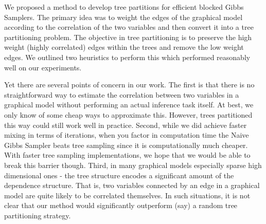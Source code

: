 \documentclass{article} %
\begin{document}
We proposed a method to develop tree partitions for efficient blocked Gibbs
Samplers. The primary idea was to weight the edges of the graphical model
according to the correlation of the two variables and then convert it into a
tree partitioning problem. The objective in tree partitioning is to preserve the
high weight (highly correlated) edges within the trees and remove the low
weight edges. We outlined two heuristics to perform this which performed
reasonably well on our experiments.

Yet there are several points of concern in our work. The first is that there
is no straightforward way to estimate the correlation between two variables in a
graphical model without performing an actual inference task itself. At best, we
only know of some cheap ways to approximate this. However, trees partitioned
this way could still work well in practice. Second, while we did achieve faster
mixing in terms of iterations, when you factor in computation time the Naive
Gibbs Sampler beats tree sampling since it is computationally much cheaper. With
faster tree sampling implementations, we hope that we would be able to break
this barrier though.
Third, in many graphical models
especially sparse high dimensional ones - the tree structure encodes a
significant amount of the dependence structure. That is, two variables connected
by an edge in a graphical model are quite likely to be correlated themselves. In
such situations, it is not clear that our method would significantly outperform
(say) a random tree partitioning strategy.

 
     
\end{document}
